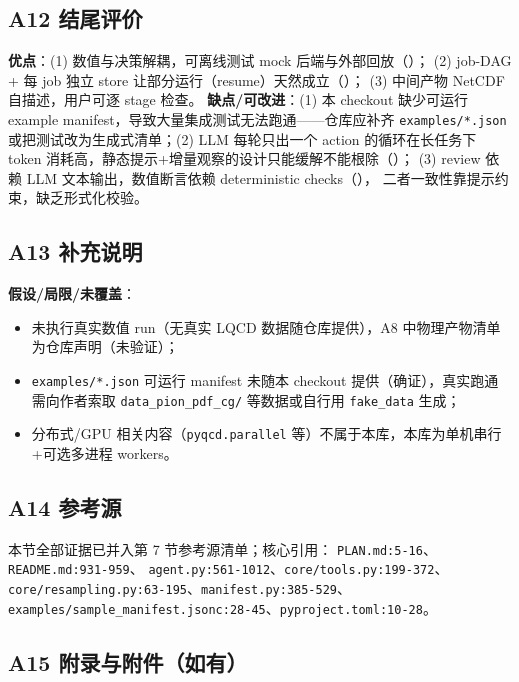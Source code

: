 \documentclass[UTF8]{ctexart}
\begin{document}
\subsection{A12 结尾评价}

\textbf{优点}：(1) 数值与决策解耦，可离线测试 mock 后端与外部回放（\texttt{}）；
(2) job-DAG + 每 job 独立 store 让部分运行（resume）天然成立（\texttt{}）；
(3) 中间产物 NetCDF 自描述，用户可逐 stage 检查。
\textbf{缺点/可改进}：(1) 本 checkout 缺少可运行 example manifest，导致大量集成测试无法跑通——仓库应补齐
\texttt{examples/*.json} 或把测试改为生成式清单；(2) LLM 每轮只出一个 action 的循环在长任务下
token 消耗高，静态提示+增量观察的设计只能缓解不能根除（\texttt{}）；
(3) review 依赖 LLM 文本输出，数值断言依赖 deterministic checks（\texttt{}），
二者一致性靠提示约束，缺乏形式化校验。

\subsection{A13 补充说明}

\textbf{假设/局限/未覆盖}：
\begin{itemize}
\item 未执行真实数值 run（无真实 LQCD 数据随仓库提供），A8 中物理产物清单为仓库声明（\textcolor{warn}{未验证}）；
\item \texttt{examples/*.json} 可运行 manifest 未随本 checkout 提供（确证），真实跑通需向作者索取
\texttt{data\_pion\_pdf\_cg/} 等数据或自行用 \texttt{fake\_data} 生成；
\item 分布式/GPU 相关内容（\texttt{pyqcd.parallel} 等）不属于本库，本库为单机串行+可选多进程 workers。
\end{itemize}

\subsection{A14 参考源}

本节全部证据已并入第 7 节参考源清单；核心引用：
\texttt{\nolinkurl{PLAN.md:5-16}}、\texttt{\nolinkurl{README.md:931-959}}、
\texttt{\nolinkurl{agent.py:561-1012}}、\texttt{\nolinkurl{core/tools.py:199-372}}、
\texttt{\nolinkurl{core/resampling.py:63-195}}、\texttt{\nolinkurl{manifest.py:385-529}}、
\texttt{\nolinkurl{examples/sample_manifest.jsonc:28-45}}、\texttt{\nolinkurl{pyproject.toml:10-28}}。

\subsection{A15 附录与附件（如有）}
\end{document}
